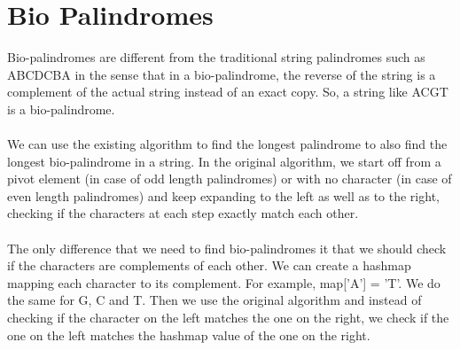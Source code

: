 \documentclass{article}
\begin{document}
\section{Bio Palindromes}
Bio-palindromes are different from the traditional string palindromes such as ABCDCBA in the sense that in a bio-palindrome, the reverse of the string is a complement of the actual string instead of an exact copy. So, a string like ACGT is a bio-palindrome. \\
\\
We can use the existing algorithm to find the longest palindrome to also find the longest bio-palindrome in a string. In the original algorithm, we start off from a pivot element (in case of odd length palindromes) or with no character (in case of even length palindromes) and keep expanding to the left as well as to the right, checking if the characters at each step exactly match each other. \\
\\
The only difference that we need to find bio-palindromes it that we should check if the characters are complements of each other. We can create a hashmap mapping each character to its complement. For example, map['A'] = 'T'. We do the same for G, C and T. Then we use the original algorithm and instead of checking if the character on the left matches the one on the right, we check if the one on the left matches the hashmap value of the one on the right. 
\clearpage
\end{document}
